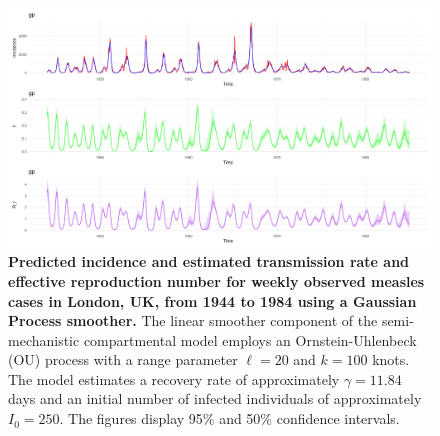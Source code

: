 \documentclass[
11pt, %
oneside, %
english, %
singlespacing, %
]{macthesis} %
\begin{document}
\begin{figure}
\centering
\includegraphics[width=\textwidth, height = \textwidth]{figure/Measles/Measles_combined_plot.png}
\caption[Predicted Measles Incidence and Estimated Transmission Rate and Effective Reproduction Number (1944-1984)]{\textbf{Predicted incidence and estimated transmission rate and effective reproduction number for weekly observed measles cases in London, UK, from 1944 to 1984 using a Gaussian Process smoother.} The linear smoother component of the semi-mechanistic compartmental model employs an Ornstein-Uhlenbeck (OU) process with a range parameter \(\ell = 20\) and \(k = 100\) knots. The model estimates a recovery rate of approximately \(\gamma = 11.84\) days and an initial number of infected individuals of approximately \(I_0 = 250\). The figures display 95\% and 50\% confidence intervals.}
\label{fig:Measles_trans}
\end{figure}
\end{document}
